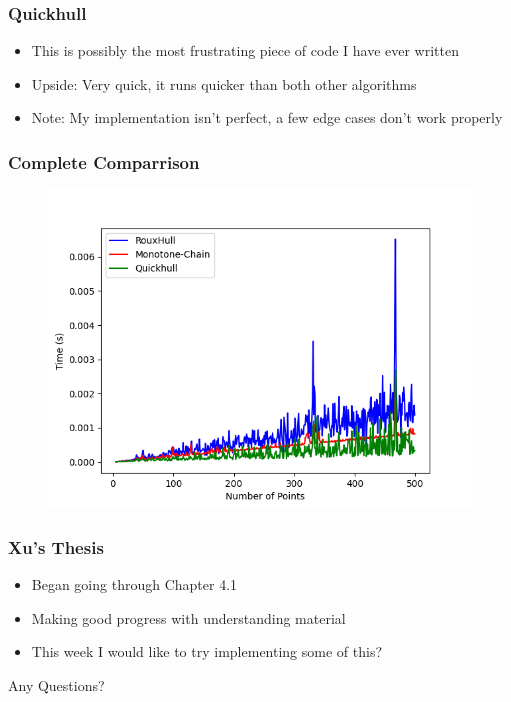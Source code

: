 \documentclass{beamer}
\begin{document}
\begin{frame}
\frametitle{Quickhull}
\begin{itemize}
	\item This is possibly the most frustrating piece of code I have ever written
	\pause 
	\item Upside: Very quick, it runs quicker than both other algorithms
	\pause
	\item Note: My implementation isn't perfect, a few edge cases don't work properly
\end{itemize}
\end{frame}

\begin{frame}
\frametitle{Complete Comparrison}
	\begin{figure}
		\center
		\includegraphics[scale=0.6]{../Figures/full_comparison.png}
	\end{figure}
\end{frame}

\begin{frame}
\frametitle{Xu's Thesis}
\begin{itemize}
	\item Began going through Chapter 4.1
	\pause
	\item Making good progress with understanding material
	\pause
	\item This week I would like to try implementing some of this?
\end{itemize}
\end{frame}
	

\begin{frame}
\Huge{\centerline{Any Questions?}}
\end{frame}
\end{document}
